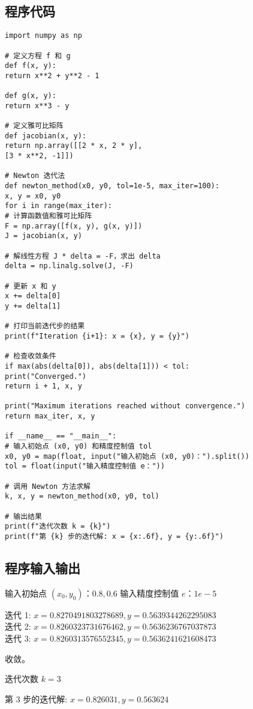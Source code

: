 \documentclass[b5paper;twoside]{article}
\begin{document}
\subsection{程序代码}

\begin{lstlisting}
import numpy as np

# 定义方程 f 和 g
def f(x, y):
return x**2 + y**2 - 1

def g(x, y):
return x**3 - y

# 定义雅可比矩阵
def jacobian(x, y):
return np.array([[2 * x, 2 * y],
[3 * x**2, -1]])

# Newton 迭代法
def newton_method(x0, y0, tol=1e-5, max_iter=100):
x, y = x0, y0
for i in range(max_iter):
# 计算函数值和雅可比矩阵
F = np.array([f(x, y), g(x, y)])
J = jacobian(x, y)

# 解线性方程 J * delta = -F，求出 delta
delta = np.linalg.solve(J, -F)

# 更新 x 和 y
x += delta[0]
y += delta[1]

# 打印当前迭代步的结果
print(f"Iteration {i+1}: x = {x}, y = {y}")

# 检查收敛条件
if max(abs(delta[0]), abs(delta[1])) < tol:
print("Converged.")
return i + 1, x, y

print("Maximum iterations reached without convergence.")
return max_iter, x, y

if __name__ == "__main__":
# 输入初始点 (x0, y0) 和精度控制值 tol
x0, y0 = map(float, input("输入初始点 (x0, y0)：").split())
tol = float(input("输入精度控制值 e："))

# 调用 Newton 方法求解
k, x, y = newton_method(x0, y0, tol)

# 输出结果
print(f"迭代次数 k = {k}")
print(f"第 {k} 步的迭代解: x = {x:.6f}, y = {y:.6f}")

\end{lstlisting}

\subsection{程序输入输出}

输入初始点 \( (x_0, y_0) \)：\( 0.8, 0.6 \)  
输入精度控制值 \( e \)：\( 1e-5 \)  

迭代 1: \( x = 0.8270491803278689, y = 0.5639344262295083 \)  \\
迭代 2: \( x = 0.8260323731676462, y = 0.5636236767037873 \)  \\
迭代 3: \( x = 0.8260313576552345, y = 0.5636241621608473 \)  

收敛。  

迭代次数 \( k = 3 \)  

第 3 步的迭代解: \( x = 0.826031, y = 0.563624 \)
\end{document}
